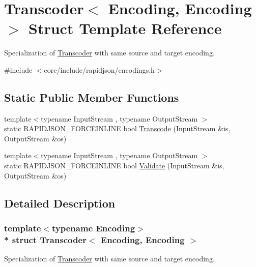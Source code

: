 \hypertarget{structTranscoder_3_01Encoding_00_01Encoding_01_4}{}\section{Transcoder$<$ Encoding, Encoding $>$ Struct Template Reference}
\label{structTranscoder_3_01Encoding_00_01Encoding_01_4}


Specialization of \hyperlink{structTranscoder}{Transcoder} with same source and target encoding.  




{\ttfamily \#include $<$core/include/rapidjson/encodings.\+h$>$}

\subsection*{Static Public Member Functions}
\begin{DoxyCompactItemize}
\item 
{\footnotesize template$<$typename Input\+Stream , typename Output\+Stream $>$ }\\static R\+A\+P\+I\+D\+J\+S\+O\+N\+\_\+\+F\+O\+R\+C\+E\+I\+N\+L\+I\+NE bool \hyperlink{structTranscoder_3_01Encoding_00_01Encoding_01_4_aad11cdc2b829123a7b9969e34d456813}{Transcode} (Input\+Stream \&is, Output\+Stream \&os)
\item 
{\footnotesize template$<$typename Input\+Stream , typename Output\+Stream $>$ }\\static R\+A\+P\+I\+D\+J\+S\+O\+N\+\_\+\+F\+O\+R\+C\+E\+I\+N\+L\+I\+NE bool \hyperlink{structTranscoder_3_01Encoding_00_01Encoding_01_4_a536aa3930251161d05e112947ec2f9c8}{Validate} (Input\+Stream \&is, Output\+Stream \&os)
\end{DoxyCompactItemize}


\subsection{Detailed Description}
\subsubsection*{template$<$typename Encoding$>$\\*
struct Transcoder$<$ Encoding, Encoding $>$}

Specialization of \hyperlink{structTranscoder}{Transcoder} with same source and target encoding. 


